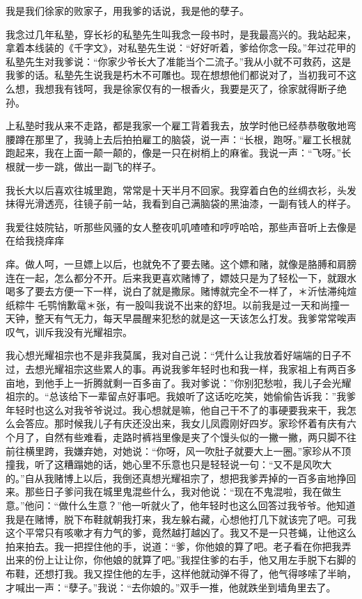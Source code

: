 \documentclass[12pt,UTF8]{ctexbook}
\begin{document}
我是我们徐家的败家子，用我爹的话说，我是他的孽子。

我念过几年私塾，穿长衫的私塾先生叫我念一段书时，是我最高兴的。我站起来，拿着本线装的《千字文》，对私塾先生说：“好好听着，爹给你念一段。”年过花甲的私塾先生对我爹说：“你家少爷长大了准能当个二流子。”我从小就不可救药，这是我爹的话。私塾先生说我是朽木不可雕也。现在想想他们都说对了，当初我可不这么想，我想我有钱呵，我是徐家仅有的一根香火，我要是灭了，徐家就得断子绝孙。

上私塾时我从来不走路，都是我家一个雇工背着我去，放学时他已经恭恭敬敬地弯腰蹲在那里了，我骑上去后拍拍雇工的脑袋，说一声：“长根，跑呀。”雇工长根就跑起来，我在上面一颠一颠的，像是一只在树梢上的麻雀。我说一声：“飞呀。”长根就一步一跳，做出一副飞的样子。

我长大以后喜欢往城里跑，常常是十天半月不回家。我穿着白色的丝绸衣衫，头发抹得光滑透亮，往镜子前一站，我看到自己满脑袋的黑油漆，一副有钱人的样子。

我爱往妓院钻，听那些风骚的女人整夜叽叽喳喳和哼哼哈哈，那些声音听上去像是在给我挠痒痒

痒。做人呵，一旦嫖上以后，也就免不了要去赌。这个嫖和赌，就像是胳膊和肩膀连在一起，怎么都分不开。后来我更喜欢赌博了，嫖妓只是为了轻松一下，就跟水喝多了要去方便一下一样，说白了就是撒尿。赌博就完全不一样了，＊沂怯滞纯煊纸粽牛乇鹗悄歉鼋＊张，有一股叫我说不出来的舒坦。以前我是过一天和尚撞一天钟，整天有气无力，每天早晨醒来犯愁的就是这一天该怎么打发。我爹常常唉声叹气，训斥我没有光耀祖宗。

我心想光耀祖宗也不是非我莫属，我对自己说：“凭什么让我放着好端端的日子不过，去想光耀祖宗这些累人的事。再说我爹年轻时也和我一样，我家祖上有两百多亩地，到他手上一折腾就剩一百多亩了。我对爹说：”你别犯愁啦，我儿子会光耀祖宗的。“总该给下一辈留点好事吧。我娘听了这话吃吃笑，她偷偷告诉我：”我爹年轻时也这么对我爷爷说过。我心想就是嘛，他自己干不了的事硬要我来干，我怎么会答应。那时候我儿子有庆还没出来，我女儿凤霞刚好四岁。家珍怀着有庆有六个月了，自然有些难看，走路时裤裆里像是夹了个馒头似的一撇一撇，两只脚不往前往横里跨，我嫌弃她，对她说：“你呀，风一吹肚子就要大上一圈。”家珍从不顶撞我，听了这糟蹋她的话，她心里不乐意也只是轻轻说一句：“又不是风吹大的。”自从我赌博上以后，我倒还真想光耀祖宗了，想把我爹弄掉的一百多亩地挣回来。那些日子爹问我在城里鬼混些什么，我对他说：“现在不鬼混啦，我在做生意。”他问：“做什么生意？”他一听就火了，他年轻时也这么回答过我爷爷。他知道我是在赌博，脱下布鞋就朝我打来，我左躲右藏，心想他打几下就该完了吧。可我这个平常只有咳嗽才有力气的爹，竟然越打越凶了。我又不是一只苍蝇，让他这么拍来拍去。我一把捏住他的手，说道：“爹，你他娘的算了吧。老子看在你把我弄出来的份上让让你，你他娘的就算了吧。”我捏住爹的右手，他又用左手脱下右脚的布鞋，还想打我。我又捏住他的左手，这样他就动弹不得了，他气得哆嗦了半晌，才喊出一声：“孽子。”我说：“去你娘的。”双手一推，他就跌坐到墙角里去了。
\end{document}
